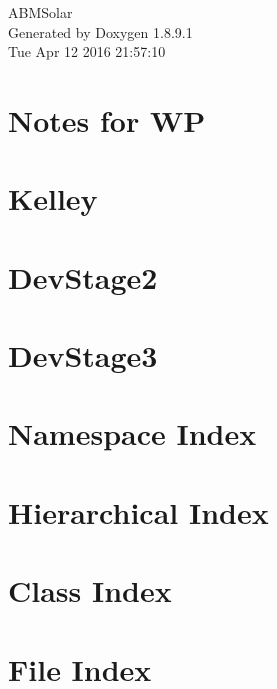 \documentclass[twoside]{book}
\newcommand{\+}{\discretionary{\mbox{\scriptsize$\hookleftarrow$}}{}{}}
\newcommand{\clearemptydoublepage}{%
  \newpage{\pagestyle{empty}\cleardoublepage}%
}
\begin{document}
\hypersetup{pageanchor=false,
             bookmarks=true,
             bookmarksnumbered=true,
             pdfencoding=unicode
            }
\begin{titlepage}
\vspace*{7cm}
\begin{center}%
{\Large A\+B\+M\+Solar }\\
\vspace*{1cm}
{\large Generated by Doxygen 1.8.9.1}\\
\vspace*{0.5cm}
{\small Tue Apr 12 2016 21:57:10}\\
\end{center}
\end{titlepage}
\clearemptydoublepage
\tableofcontents
\clearemptydoublepage
{}
\hypersetup{pageanchor=true}

\chapter{Notes for W\+P}
\label{wp}
\hypertarget{wp}{}

\chapter{Kelley}
\label{_kelley}
\hypertarget{_kelley}{}

\chapter{Dev\+Stage2}
\label{_dev_stage2}
\hypertarget{_dev_stage2}{}

\chapter{Dev\+Stage3}
\label{_dev_stage3}
\hypertarget{_dev_stage3}{}

\chapter{Namespace Index}

\chapter{Hierarchical Index}

\chapter{Class Index}

\chapter{File Index}

\end{document}
